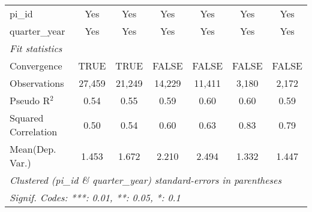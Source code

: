 \begin{tabular}{lcccccc}
   pi\_id                                                     & Yes           & Yes           & Yes           & Yes           & Yes           & Yes\\  
   quarter\_year                                              & Yes           & Yes           & Yes           & Yes           & Yes           & Yes\\  
   \midrule
   \emph{Fit statistics}\\
   Convergence                                                &TRUE           & TRUE          & FALSE         & FALSE         & FALSE         & FALSE\\  
   Observations                                               & 27,459        & 21,249        & 14,229        & 11,411        & 3,180         & 2,172\\  
   Pseudo R$^2$                                               & 0.54          & 0.55          & 0.59          & 0.60          & 0.60          & 0.59\\  
   Squared Correlation                                        & 0.50          & 0.54          & 0.60          & 0.63          & 0.83          & 0.79\\  
Mean(Dep. Var.) & 1.453 & 1.672 & 2.210 & 2.494 & 1.332 & 1.447 \\
   \midrule \midrule
   \multicolumn{7}{l}{\emph{Clustered (pi\_id \& quarter\_year) standard-errors in parentheses}}\\
   \multicolumn{7}{l}{\emph{Signif. Codes: ***: 0.01, **: 0.05, *: 0.1}}\\
\end{tabular}
\par\endgroup
